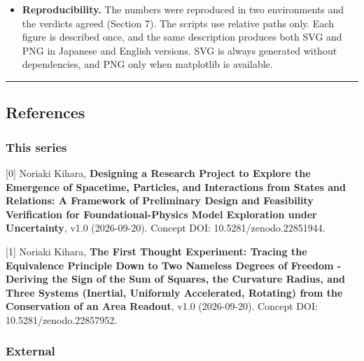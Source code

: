 \documentclass[
  a4paper,
]{article}
\begin{document}
\begin{itemize}
  \(X\) with one revolution of the readout \(z\) (one revolution of
  \(X\) is two of \(z\), so the clock sum of E4b is twice the Kepler
  period); (2) A.20 did not make explicit the double root of the
  second-order rule in the parabolic type; (3) Section 9 listed T17
  among the candidates for novelty while admitting that it may overlap
  with the known correspondence of conserved quantities; (4) the
  operational explanation of the mass ratio in C4 was too strong; (5)
  Section 11 wrote ``either'' for three conditions. The main theorems
  and the numerical data are unchanged.
\item
  \textbf{Reproducibility.} The numbers were reproduced in two
  environments and the verdicts agreed (Section 7). The scripts use
  relative paths only. Each figure is described once, and the same
  description produces both SVG and PNG in Japanese and English
  versions. SVG is always generated without dependencies, and PNG only
  when matplotlib is available.
\end{itemize}

\begin{center}\rule{0.5\linewidth}{0.5pt}\end{center}

\subsection{References}\label{references}

\subsubsection{This series}\label{this-series}

{[}0{]} Noriaki Kihara, \textbf{Designing a Research Project to Explore
the Emergence of Spacetime, Particles, and Interactions from States and
Relations: A Framework of Preliminary Design and Feasibility
Verification for Foundational-Physics Model Exploration under
Uncertainty}, v1.0 (2026-09-20). Concept DOI: 10.5281/zenodo.22851944.

{[}1{]} Noriaki Kihara, \textbf{The First Thought Experiment: Tracing
the Equivalence Principle Down to Two Nameless Degrees of Freedom -
Deriving the Sign of the Sum of Squares, the Curvature Radius, and Three
Systems (Inertial, Uniformly Accelerated, Rotating) from the
Conservation of an Area Readout}, v1.0 (2026-09-20). Concept DOI:
10.5281/zenodo.22857952.

\subsubsection{External}\label{external}
\end{document}
